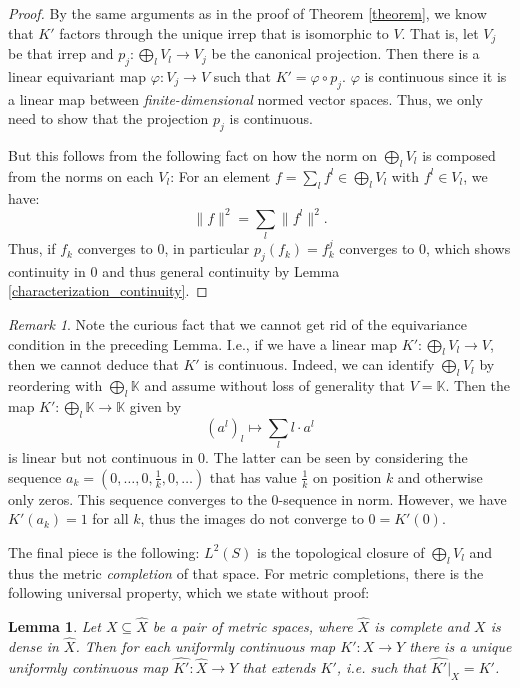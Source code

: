 \documentclass[12pt, a4paper]{article}
\theoremstyle{plain}
\newtheorem{lem}[pro]{Lemma}
\theoremstyle{definition}
\theoremstyle{remark}
\newtheorem{rem}[pro]{Remark}
\newcommand{\K}{\mathds{K}}
\begin{document}
\begin{proof}
By the same arguments as in the proof of Theorem \ref{theorem}, we know that $K'$ factors through the unique irrep that is isomorphic to $V$. That is, let $V_j$ be that irrep and $p_j: \bigoplus_{l} V_l \to V_j$ be the canonical projection. Then there is a linear equivariant map $\varphi: V_j \to V$ such that $K' = \varphi \circ p_j$. $\varphi$ is continuous since it is a linear map between \emph{finite-dimensional} normed vector spaces. Thus, we only need to show that the projection $p_j$ is continuous.

But this follows from the following fact on how the norm on $\bigoplus_{l}V_l$ is composed from the norms on each $V_l$: For an element $f = \sum_{l} f^l \in \bigoplus_{l} V_l$ with $f^l \in V_l$, we have:
\begin{equation*}
\|f\|^2 = \sum_{l} \|f^l\|^2.
\end{equation*}
Thus, if $f_k$ converges to $0$, in particular $p_j(f_k) = f_k^j$ converges to $0$, which shows continuity in $0$ and thus general continuity by Lemma \ref{characterization_continuity}.
\end{proof}

\begin{rem}
Note the curious fact that we cannot get rid of the equivariance condition in the preceding Lemma. I.e., if we have a linear map $K': \bigoplus_l V_l \to V$, then we cannot deduce that $K'$ is continuous. Indeed, we can identify $\bigoplus_l V_l$ by reordering with $\bigoplus_{l} \K$ and assume without loss of generality that $V = \K$. Then the map $K': \bigoplus_{l} \K \to \K$ given by
\begin{equation*}
\left( a^l\right)_{l} \mapsto \sum_{l} l \cdot a^l
\end{equation*}
is linear but not continuous in $0$. The latter can be seen by considering the sequence $a_k = (0, \dots, 0, \frac{1}{k}, 0, \dots)$ that has value $\frac{1}{k}$ on position $k$ and otherwise only zeros. This sequence converges to the $0$-sequence in norm. However, we have $K'(a_k) = 1$ for all $k$, thus the images do not converge to $0 = K'(0)$.
\end{rem}

The final piece is the following: $L^2(S)$ is the topological closure of $\bigoplus_l V_l$ and thus the metric \emph{completion} of that space. For metric completions, there is the following universal property, which we state without proof:

\begin{lem}\label{universal_property}
Let $X \subseteq \hat{X}$ be a pair of metric spaces, where $\hat{X}$ is complete and $X$ is dense in $\hat{X}$. Then for each uniformly continuous map $K': X \to Y$ there is a unique uniformly continuous map $\hat{K'}: \hat{X} \to Y$ that extends $K'$, i.e. such that $\hat{K'}|_X = K'$.
\end{lem}
\end{document}
